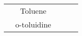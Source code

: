 \begin{table}[H]
\begin{tabular}{@{}lcccl@{}}
                                                      & Toluene                                                  &                                                                                               &                                                    &                                                                                                                                                                                                                                                                                                                                                                                                                                                                                                                                                                                                                                                                                                                                                                                                                                                                                                                                                     \\
                                                      & o-toluidine                                              &                                                                                               &                                                    &                                                                                                                                                                                                                                                                                                                                                                                                                                                                                                                                                                                                                                                                                                                                                                                                                                                                                                                                                     \\

\end{tabular}
\end{table}

